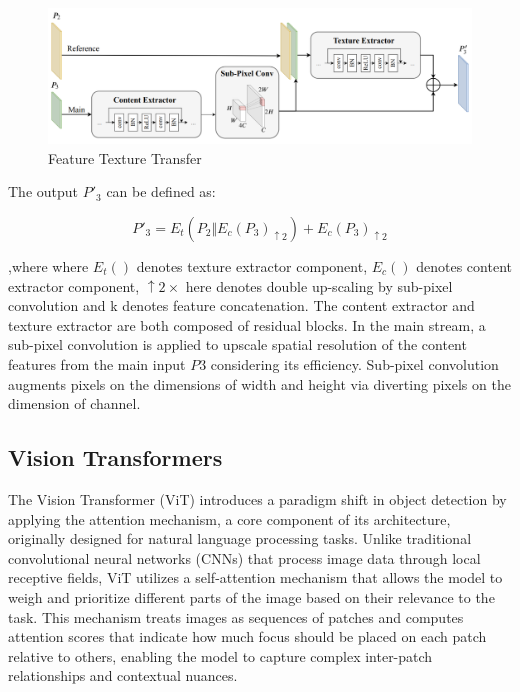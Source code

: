 \begin{figure}
    \centering
    \includegraphics[scale=0.18]{Figures/fft.png}
    \caption{Feature Texture Transfer \cite{efpn}}
    \label{fig:ftt}
\end{figure}

\newpage
The output $P'_3$ can be defined as:

\begin{equation}
    P'_3 = E_t(P_2 \Vert E_c(P_3)_{\uparrow 2}) + E_c(P_3)_{\uparrow 2} \tag{5}
\end{equation}


,where where $E_t()$ denotes texture extractor component, $E_c()$ denotes content extractor component, $\uparrow 2\times$ here denotes double up-scaling by 
sub-pixel convolution and k denotes feature concatenation. The content extractor and texture extractor are both composed of residual blocks. In the main stream, 
a sub-pixel convolution is applied to upscale spatial resolution of the content features from the main input $P3$ considering its efficiency.
Sub-pixel convolution augments pixels on the dimensions of width and height via diverting pixels on the dimension of channel.

\newpage
\subsection{Vision Transformers}

The Vision Transformer (ViT) \cite{visiontr} introduces a paradigm shift in object detection by applying the attention mechanism, a core component of its architecture, 
originally designed for natural language processing tasks. Unlike traditional convolutional neural networks (CNNs) that process image data through local receptive 
fields, ViT utilizes a self-attention mechanism that allows the model to weigh and prioritize different parts of the image based on their relevance to the task. 
This mechanism treats images as sequences of patches and computes attention scores that indicate how much focus should be placed on each patch relative to others, 
enabling the model to capture complex inter-patch relationships and contextual nuances.

